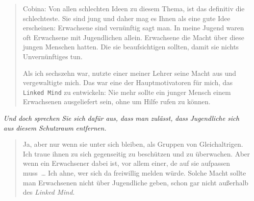 \documentclass{scrartcl}
\newenvironment{frage}{\itshape}{}
\newenvironment{antworta}{
  \begin{quotation}
  }{
  \end{quotation}
}
\begin{document}
\begin{antworta}
Cobina: Von allen schlechten Ideen zu diesem Thema, ist das
definitiv die schlechteste. Sie sind jung und daher mag es
Ihnen als eine gute Idee erscheinen: Erwachsene sind
vernünftig sagt man. In meine Jugend waren oft Erwachsene
mit Jugendlichen allein. Erwachsene die Macht über diese
jungen Menschen hatten. Die sie beaufsichtigen sollten,
damit sie nichts Unvernünftiges tun.

Als ich sechszehn war, nutzte einer meiner Lehrer seine
Macht aus und vergewaltigte mich. Das war eine der
Hauptmotivatoren für mich, das \texttt{Linked Mind} zu entwickeln:
Nie mehr sollte ein junger Mensch einem Erwachsenen
ausgeliefert sein, ohne um Hilfe rufen zu können.
\end{antworta}


\begin{frage}
Und doch sprechen Sie sich dafür aus, dass man zulässt, dass
Jugendliche sich aus diesem Schutzraum entfernen.
\end{frage}


\begin{antworta}
Ja, aber nur wenn sie unter sich bleiben, als Gruppen von
Gleichaltrigen. Ich traue ihnen zu sich gegenseitig zu
beschützen und zu überwachen. Aber wenn ein Erwachsener
dabei ist, vor allem einer, de auf sie aufpassen muss~… Ich
ahne, wer sich da freiwillig melden würde. Solche Macht
sollte man Erwachsenen nicht über Jugendliche geben, schon
gar nicht außerhalb des \emph{Linked Mind}.
\end{antworta}
\end{document}
